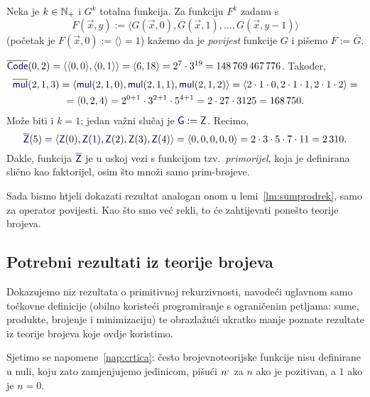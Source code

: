 \begin{definicija}[{name=[povijest totalne brojevne funkcije]}]
Neka je $k\in{\mathbb N}_+$ i $G^k$ totalna funkcija. Za funkciju $F^k$ zadanu s
\begin{equation}\label{eq:povijest}
    F(\vec x,y):=\langle G(\vec x,0),G(\vec x,1),\dotsc,G(\vec x,y-1)\rangle
\end{equation}
(početak je $F(\vec x,0):=\langle\rangle=1$) kažemo da je \emph{povijest} funkcije $G$ i pišemo $F:=\overline G$.
\end{definicija}

\begin{primjer}[{name=[primorijel kao povijest nulfunkcije]}]\label{pr:primorijel}
$\overline{\f{Code}}(0,2)=\kr{\kr{0,0},\kr{0,1}}=\kr{6,18}=2^7\cdot3^{19}=148\,769\,467\,776$. Također,
\begin{multline}
    \overline{\f{mul}}(2,1,3)=\langle\f{mul}(2,1,0),\f{mul}(2,1,1),\f{mul}(2,1,2)\rangle=\langle2\cdot1\cdot0,2\cdot1\cdot1,2\cdot1\cdot2\rangle=\\
    =\langle0,2,4\rangle=2^{0+1}\cdot3^{2+1}\cdot5^{4+1}=2\cdot27\cdot3125=168\,750.
\end{multline}
Može biti i $k=1$; jedan važni slučaj je $\f G:=\f Z$. Recimo,
\begin{equation}
    \overline{\f Z}(5)=\langle\f Z(0),\f Z(1),\f Z(2),\f Z(3),\f Z(4)\rangle=\langle0,0,0,0,0\rangle=2\cdot3\cdot5\cdot7\cdot11=2\,310.
\end{equation}
Dakle, funkcija $\overline{\f Z}$ je u uskoj vezi s funkcijom tzv.\ \emph{primorijel}, koja je definirana slično kao faktorijel, osim što množi samo prim-brojeve.
\end{primjer}

Sada bismo htjeli dokazati rezultat analogan onom u lemi~\ref{lm:sumprodrek}, samo za operator povijesti. Kao što smo već rekli, to će zahtijevati ponešto teorije brojeva.

\subsection{Potrebni rezultati iz teorije brojeva}\label{sec:teobroj}

Dokazujemo niz rezultata o primitivnoj rekurzivnosti, navodeći uglavnom samo toč\-kov\-ne definicije (obilno koristeći programiranje s ograničenim petljama: sume, produkte, brojenje i minimizaciju) te obrazlažući ukratko manje poznate rezultate iz teorije brojeva koje ovdje koristimo.

Sjetimo se napomene~\ref{nap:crtica}: često brojevnoteorijske funkcije nisu definirane u nuli, koju zato zamjenjujemo jedinicom, pišući $n\sp{\text{\normalsize.}}$ za $n$ ako je pozitivan, a $1$ ako je $n=0$.

